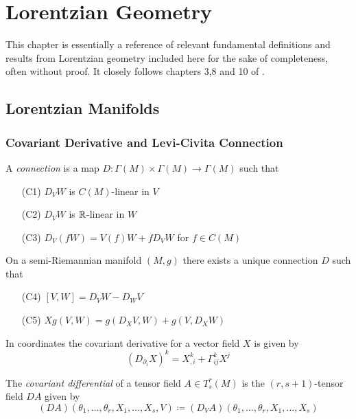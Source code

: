 \chapter{Lorentzian Geometry}
This chapter is essentially a reference of relevant fundamental definitions and results from Lorentzian geometry included here for the sake of completeness, often without proof. It closely follows chapters 3,8 and 10 of \cite{oneill}.
\section{Lorentzian Manifolds}
\subsection{Covariant Derivative and Levi-Civita Connection}

\begin{definition}[Connection]
A \emph{connection} is a map $D:\Gamma(M)\times\Gamma(M)\to\Gamma(M)$ such that

\begin{itemize}
    \item[(C1)] $D_VW$ is $C(M)$-linear in $V$
    \item[(C2)] $D_VW$ is $\mathbb{R}$-linear in $W$
    \item[(C3)] $D_V(fW) = V(f)W + fD_VW$ for $f\in C(M)$
\end{itemize}

\end{definition}

\begin{theorem}
On a semi-Riemannian manifold $(M,g)$ there exists a unique connection $D$ such that
\begin{itemize}
    \item[(C4)] $[V,W] = D_VW-D_WV$
    \item[(C5)] $Xg(V,W)=g(D_XV,W)+g(V,D_XW)$
\end{itemize}
\end{theorem}


\begin{proposition}
In coordinates the covariant derivative for a vector field $X$ is given by 
\begin{equation*}
    (D_{\partial_i}X)^{k} = X^k_{,i}+\Gamma^k_{ij}X^j
\end{equation*}
\end{proposition}

\begin{definition}
The \emph{covariant differential} of a tensor field $A\in T^r_s(M)$ is the $(r,s+1)$-tensor field $DA$ given by
\begin{equation*}
    (DA)(\theta_1,\dots,\theta_r,X_1,\dots,X_s,V) \coloneqq (D_VA)(\theta_1,\dots,\theta_r,X_1,\dots,X_s)
\end{equation*}
\end{definition}

